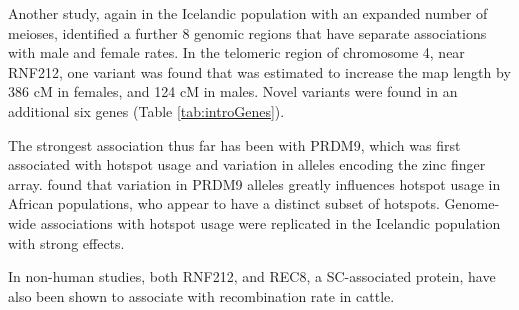 Another study, again in the Icelandic population with an expanded number of meioses, identified a further 8 genomic regions that have separate associations with male and female rates\cite{Kong2014}.
In the telomeric region of chromosome 4, near RNF212, one variant was found that was estimated to increase the map length by 386 cM in females, and 124 cM in males.
Novel variants were found in an additional six genes (Table \ref{tab:introGenes}).

The strongest association thus far has been with PRDM9, which was first associated with hotspot usage and variation in alleles encoding the zinc finger array\cite{Baudat2010,Berg2010}.
\citet{Berg2011} found that variation in PRDM9 alleles greatly influences hotspot usage in African populations, who appear to have a distinct subset of hotspots\cite{Hinch2011}.
Genome-wide associations with hotspot usage were replicated in the Icelandic population with strong effects\cite{Kong2010}.

In non-human studies, both RNF212, and REC8, a SC-associated protein, have also been shown to associate with recombination rate in cattle\cite{Sandor2012}.

